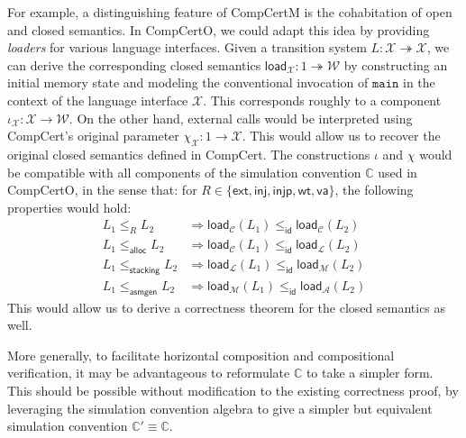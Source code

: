 \documentclass[11pt,oneside,draft]{book}
\theoremstyle{definition}
\newcommand{\kw}[1]{\ensuremath{ \mathsf{#1} }}
\begin{document}
For example,
a distinguishing feature of CompCertM
is the cohabitation of open and closed semantics.
In CompCertO,
we could adapt this idea by providing
\emph{loaders} for various language interfaces.
Given a transition system $L : \mathcal{X} \twoheadrightarrow \mathcal{X}$,
we can derive the corresponding closed semantics
$\kw{load}_\mathcal{X} : 1 \twoheadrightarrow \mathcal{W}$
by constructing an initial memory state
and modeling the conventional invocation of $\texttt{main}$
in the context of the language interface $\mathcal{X}$.
This corresponds roughly to a component
$\iota_\mathcal{X} : \mathcal{X} \rightarrow \mathcal{W}$.
On the other hand,
external calls would be interpreted using
CompCert's original parameter
$\chi_\mathcal{X} : 1 \rightarrow \mathcal{X}$.
This would allow us to recover
the original closed semantics defined in CompCert.
The constructions $\iota$ and $\chi$ would be compatible
with all components of the simulation convention $\mathbb{C}$
used in CompCertO,
in the sense that:
for $R \in \{ \kw{ext}, \kw{inj}, \kw{injp}, \kw{wt}, \kw{va} \}$,
the following properties would hold:
\begin{align*}
  L_1 \le_R L_2 &\Rightarrow
    \kw{load}_\mathcal{C}(L_1) \le_\kw{id} \kw{load}_\mathcal{C}(L_2) \\
  L_1 \le_\kw{alloc} L_2 &\Rightarrow
    \kw{load}_\mathcal{C}(L_1) \le_\kw{id} \kw{load}_\mathcal{L}(L_2) \\
  L_1 \le_\kw{stacking} L_2 &\Rightarrow
    \kw{load}_\mathcal{L}(L_1) \le_\kw{id} \kw{load}_\mathcal{M}(L_2) \\
  L_1 \le_\kw{asmgen} L_2 &\Rightarrow
    \kw{load}_\mathcal{M}(L_1) \le_\kw{id} \kw{load}_\mathcal{A}(L_2)
\end{align*}
This would allow us to derive a correctness theorem
for the closed semantics as well.

More generally,
to facilitate horizontal composition
and compositional verification,
it may be advantageous to reformulate
$\mathbb{C}$
to take a simpler form.
This should be possible without
modification to the existing correctness proof,
by leveraging the simulation convention algebra
to give a simpler but equivalent
simulation convention $\mathbb{C}' \equiv \mathbb{C}$.
\end{document}
